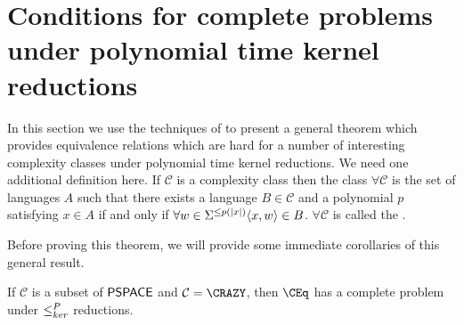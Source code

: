 \section{Conditions for complete problems under polynomial time kernel reductions}

In this section we use the techniques of \cite[Theorem~8.7]{bcffm} to present a general theorem which provides equivalence relations which are hard for a number of interesting complexity classes under polynomial time kernel reductions.
We need one additional definition here.
If $\mathcal{C}$ is a complexity class then the class $\forall\mathcal{C}$ is the set of languages $A$ such that there exists a language $B\in\mathcal{C}$ and a polynomial $p$ satisfying $x\in A$ if and only if $\forall w\in\Sigma^{\leq p(|x|)} \langle x,w\rangle\in B$.
$\forall\mathcal{C}$ is called the .

\begin{theorem}\label{thm:generalcompleteness}
  \printcompletenesstheorem
\end{theorem}

Before proving this theorem, we will provide some immediate corollaries of this general result.

\begin{corollary}
  If $\mathcal{C}$ is a subset of ${\mathsf{PSPACE}}$ and $\mathcal{C}=\CRAZY$, then $\CEq$ has a complete problem under $\leq^{P}_{ker}$ reductions.
\end{corollary}

